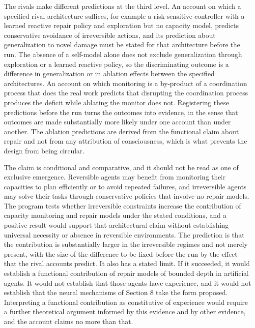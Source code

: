 \documentclass[11pt]{article}
\theoremstyle{definition}
\theoremstyle{plain}
\theoremstyle{remark}
\begin{document}
The rivals make different predictions at the third level. An account on which a specified rival architecture suffices, for example a risk-sensitive controller with a learned reactive repair policy and exploration but no capacity model, predicts conservative avoidance of irreversible actions, and its prediction about generalization to novel damage must be stated for that architecture before the run. The absence of a self-model alone does not exclude generalization through exploration or a learned reactive policy, so the discriminating outcome is a difference in generalization or in ablation effects between the specified architectures. An account on which monitoring is a by-product of a coordination process that does the real work predicts that disrupting the coordination process produces the deficit while ablating the monitor does not. Registering these predictions before the run turns the outcomes into evidence, in the sense that outcomes are made substantially more likely under one account than under another. The ablation predictions are derived from the functional claim about repair and not from any attribution of consciousness, which is what prevents the design from being circular.

The claim is conditional and comparative, and it should not be read as one of exclusive emergence. Reversible agents may benefit from monitoring their capacities to plan efficiently or to avoid repeated failures, and irreversible agents may solve their tasks through conservative policies that involve no repair models. The program tests whether irreversible constraints increase the contribution of capacity monitoring and repair models under the stated conditions, and a positive result would support that architectural claim without establishing universal necessity or absence in reversible environments. The prediction is that the contribution is substantially larger in the irreversible regimes and not merely present, with the size of the difference to be fixed before the run by the effect that the rival accounts predict. It also has a stated limit. If it succeeded, it would establish a functional contribution of repair models of bounded depth in artificial agents. It would not establish that those agents have experience, and it would not establish that the neural mechanisms of Section 8 take the form proposed. Interpreting a functional contribution as constitutive of experience would require a further theoretical argument informed by this evidence and by other evidence, and the account claims no more than that.
\end{document}
